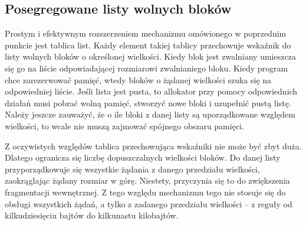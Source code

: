 \documentclass[12pt,a4paper,titlepage,twoside]{mwart}
\begin{document}
\subsection{Posegregowane listy wolnych bloków}

Prostym i efektywnym rozszerzeniem mechanizmu omówionego w poprzednim punkcie
jest tablica list. Każdy element takiej tablicy przechowuje wskaźnik do listy
wolnych bloków o określonej wielkości. Kiedy blok jest zwalniany umieszcza się
go na liście odpowiadającej rozmiarowi zwalnianiego bloku. Kiedy program chce
zarezerwować pamięć, wtedy bloków o żądanej wielkości szuka się na odpowiedniej
liście. Jeśli lista jest pusta, to allokator przy pomocy odpowiednich działań
musi pobrać wolną pamięć, stworzyć nowe bloki i uzupełnić pustą listę.  Należy
jeszcze zauważyć, że o ile bloki z danej listy są uporządkowane względem
wielkości, to wcale nie muszą zajmować spójnego obszaru pamięci.

Z oczywistych względów tablica przechowująca wskaźniki nie może być zbyt duża.
Dlatego ogranicza się liczbę dopuszczalnych wielkości bloków. Do danej listy
przyporządkowuje się wszystkie żądania z danego przedziału wielkości,
zaokrąglając żądany rozmiar w górę. Niestety, przyczynia się to do zwiększenia
fragmentacji wewnętrznej. Z tego względu mechanizmu tego nie stosuje się do
obsługi wszystkich żądań, a tylko z zadanego przedziału wielkości -- z reguły
od kilkudziesięciu bajtów do kilkunastu kilobajtów.
\end{document}
